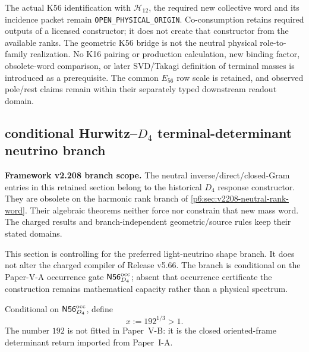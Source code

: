 \documentclass[12pt,a4paper]{article}
\begin{document}
The actual K56 identification with $\mathcal H_{12}$, the required new
collective word and its incidence packet remain
\texttt{OPEN\_PHYSICAL\_ORIGIN}. Co-consumption retains required outputs
of a licensed constructor; it does not create that constructor from the
available ranks. The geometric K56 bridge is not the neutral physical
role-to-family realization. No K16 pairing or production calculation,
new binding factor, obsolete-word comparison, or later SVD/Takagi
definition of terminal masses is introduced as a prerequisite.
The common $E_{56}$ row scale is retained, and observed pole/rest claims
remain within their separately typed downstream readout domain.

\subsection{conditional Hurwitz--\texorpdfstring{\(D_4\)}{D4} terminal-determinant neutrino branch}
\label{p6:sec:v567-d4-terminal-neutrino}

\noindent\textbf{Framework v2.208 branch scope.}
The neutral inverse/direct/closed-Gram entries in this retained section
belong to the historical $D_4$ response constructor. They are obsolete
on the harmonic rank branch of \ref{p6:sec:v2208-neutral-rank-word}.
Their algebraic theorems neither force nor constrain that new mass word.
The charged results and branch-independent geometric/source rules keep
their stated domains.


This section is controlling for the preferred light-neutrino shape branch.
It does not alter the charged compiler of Release v5.66.  The branch is
conditional on the Paper-V-A occurrence gate
\(\mathsf{N56}_{D_4}^{\rm occ}\); absent that occurrence certificate the
construction remains mathematical capacity rather than a physical spectrum.

\begin{definition}
\label{p6:def:v567-d4-terminal-x}
Conditional on \(\mathsf{N56}_{D_4}^{\rm occ}\), define
\[
 \boxed{x:=192^{1/3}>1.}
\]
The number \(192\) is not fitted in Paper~V-B: it is the closed oriented-frame
determinant return imported from Paper~I-A.
\end{definition}
\end{document}
